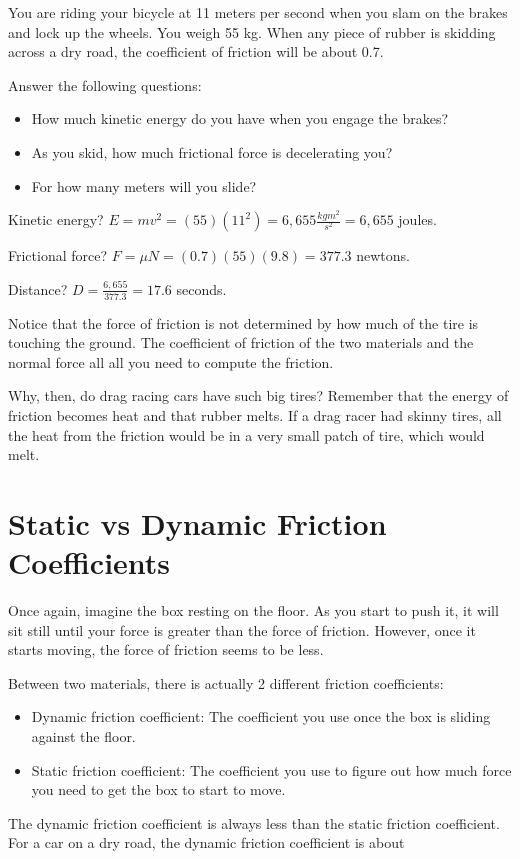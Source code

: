 \begin{Exercise}[title={Bicycle Stopping},  label=bike_stop]
  
You are riding your bicycle at 11 meters per second when you slam on the brakes and lock up the wheels.  
You weigh 55 kg.   
When any piece of rubber is skidding across a dry road,  the coefficient of friction will be about 0.7.

Answer the following questions: 

\begin{itemize}
\item How much kinetic energy do you have when you engage the brakes?
\item As you skid,  how much frictional force is decelerating you?
\item For how many meters will you slide?
\end{itemize}

\end{Exercise}
\begin{Answer}[ref=bike_stop]

Kinetic energy? $E = mv^2 = (55)(11^2) = 6,655 \frac{kg m^2}{s^2} = 6,655$ joules.

Frictional force? $F = \mu N = (0.7)(55)(9.8) = 377.3$ newtons.

Distance?  $D = \frac{6,655}{377.3} = 17.6$ seconds.

\end{Answer}

Notice that the force of friction is not determined by how much of the tire is touching the ground.  The coefficient of friction of the two materials and the normal force all all you need to compute the friction.

Why, then, do drag racing cars have such big tires?  Remember that the energy of friction becomes heat and that rubber melts.  If a drag racer had skinny tires,  all the heat from the friction would be in a very small patch of tire, which would melt.

\section{Static vs Dynamic Friction Coefficients}

Once again, imagine the box resting on the floor.  As you start to push it,  it will sit still until your force is greater than the force of friction.   However, once it starts moving,  the force of friction seems to be less.

Between two materials,  there is actually 2 different friction coefficients:

\begin{itemize}
\item Dynamic friction coefficient:  The coefficient you use once the box is sliding against the floor.
\item Static friction coefficient: The coefficient you use to figure out how much force you need to get the box to start to move.
\end{itemize}

The dynamic friction coefficient is always less than the static friction coefficient.  For a car on a dry road,  the dynamic friction coefficient is about 


